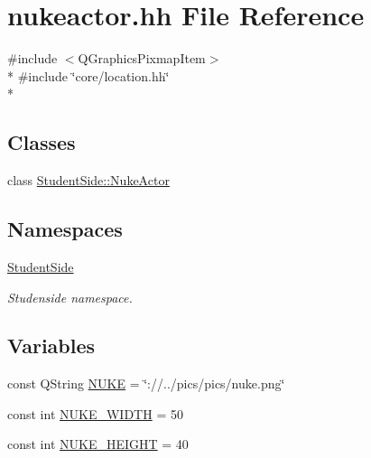 \hypertarget{nukeactor_8hh}{\section{nukeactor.\-hh File Reference}
\label{nukeactor_8hh}
}
{\ttfamily \#include $<$Q\-Graphics\-Pixmap\-Item$>$}\\*
{\ttfamily \#include \char`\"{}core/location.\-hh\char`\"{}}\\*
\subsection*{Classes}
\begin{DoxyCompactItemize}
\item 
class \hyperlink{class_student_side_1_1_nuke_actor}{Student\-Side\-::\-Nuke\-Actor}
\end{DoxyCompactItemize}
\subsection*{Namespaces}
\begin{DoxyCompactItemize}
\item 
\hyperlink{namespace_student_side}{Student\-Side}
\begin{DoxyCompactList}\small\item\em Studenside namespace. \end{DoxyCompactList}\end{DoxyCompactItemize}
\subsection*{Variables}
\begin{DoxyCompactItemize}
\item 
const Q\-String \hyperlink{nukeactor_8hh_a533b7f84d79dc6971f2d2b7db8c9206e}{N\-U\-K\-E} = \char`\"{}\-://../pics/pics/nuke.\-png\char`\"{}
\item 
const int \hyperlink{nukeactor_8hh_a86069c9a9259fea726afb281654acb9c}{N\-U\-K\-E\-\_\-\-W\-I\-D\-T\-H} = 50
\item 
const int \hyperlink{nukeactor_8hh_aa87a4f879db9b0096ae5c8b47973368c}{N\-U\-K\-E\-\_\-\-H\-E\-I\-G\-H\-T} = 40
\end{DoxyCompactItemize}



